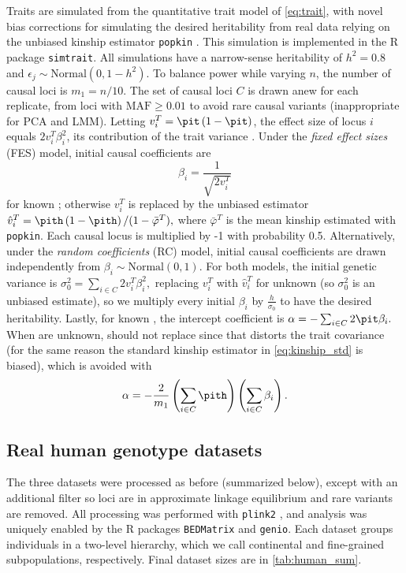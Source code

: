 \documentclass[11pt]{article}
\begin{document}
Traits are simulated from the quantitative trait model of \cref{eq:trait}, with novel bias corrections for simulating the desired heritability from real data relying on the unbiased kinship estimator \texttt{popkin} \citep{ochoa_estimating_2021}.
This simulation is implemented in the R package \texttt{simtrait}.
All simulations have a narrow-sense heritability of $h^2 = 0.8$ and $\epsilon_j \sim \text{Normal}(0, 1 - h^2 )$.
To balance power while varying $n$, the number of causal loci is $m_1 = n / 10$.
The set of causal loci $C$ is drawn anew for each replicate, from loci with $\text{MAF} \ge 0.01$ to avoid rare causal variants (inappropriate for PCA and LMM).
Letting $v_i^T = \pit \left( 1 - \pit \right)$, the effect size of locus $i$ equals $2 v_i^T \beta_i^2$, its contribution of the trait variance \citep{park_estimation_2010}.
Under the \textit{fixed effect sizes} (FES) model, initial causal coefficients are
$$
\beta_i = \frac{1}{ \sqrt{ 2 v_i^T } }
$$
for known \pit; otherwise $v_i^T$ is replaced by the unbiased estimator \citep{ochoa_estimating_2021}
$
\hat{v}_i^T
=
\pith \left( 1 - \pith \right) / ( 1 - \bar{\varphi}^T )
,
$
where $\bar{\varphi}^T$ is the mean kinship estimated with \texttt{popkin}.
Each causal locus is multiplied by -1 with probability 0.5.
Alternatively, under the \textit{random coefficients} (RC) model, initial causal coefficients are drawn independently from $\beta_i \sim \text{Normal}( 0, 1 )$.
For both models, the initial genetic variance is
$
\sigma^2_0
=
\sum_{i \in C} 2 v_i^T \beta_i^2 ,
$
replacing $v_i^T$ with $\hat{v}_i^T$ for unknown \pit (so $\sigma^2_0$ is an unbiased estimate), so we multiply every initial $\beta_i$ by $\frac{h}{ \sigma_0 }$ to have the desired heritability.
Lastly, for known \pit, the intercept coefficient is
$
\alpha = - \sum_{i \in C} 2 \pit \beta_i.
$
When \pit are unknown, \pith should not replace \pit since that distorts the trait covariance (for the same reason the standard kinship estimator in \cref{eq:kinship_std} is biased), which is avoided with
$$
\alpha = - \frac{2}{m_1} \left( \sum_{i \in C} \pith \right) \left(\sum_{i \in C} \beta_i \right).
$$

\subsection{Real human genotype datasets}

The three datasets were processed as before \citep{ochoa_human} (summarized below), except with an additional filter so loci are in approximate linkage equilibrium and rare variants are removed.
All processing was performed with \texttt{plink2} \citep{chang_second-generation_2015}, and analysis was uniquely enabled by the R packages \texttt{BEDMatrix} \citep{grueneberg_bgdata_2019} and \texttt{genio}.
Each dataset groups individuals in a two-level hierarchy, which we call continental and fine-grained subpopulations, respectively.
Final dataset sizes are in \cref{tab:human_sum}.
\end{document}
